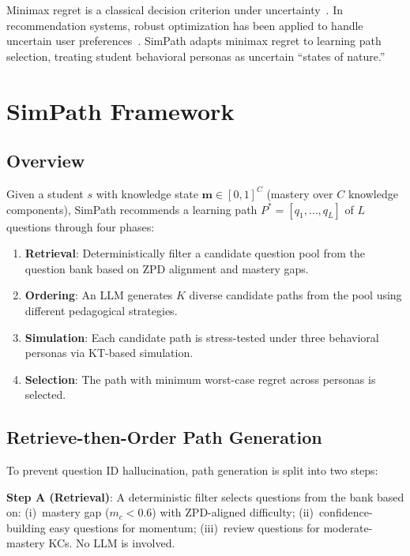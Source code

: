 \documentclass[runningheads]{llncs}
\begin{document}
Minimax regret is a classical decision criterion under uncertainty~\cite{savage1951}.
In recommendation systems, robust optimization has been applied to handle uncertain user preferences~\cite{robust_rec2020}.
SimPath adapts minimax regret to learning path selection, treating student behavioral personas as uncertain ``states of nature.''

\section{SimPath Framework}

\subsection{Overview}

Given a student $s$ with knowledge state $\mathbf{m} \in [0,1]^C$ (mastery over $C$ knowledge components), SimPath recommends a learning path $P^* = [q_1, \dots, q_L]$ of $L$ questions through four phases:

\begin{enumerate}
\item \textbf{Retrieval}: Deterministically filter a candidate question pool from the question bank based on ZPD alignment and mastery gaps.
\item \textbf{Ordering}: An LLM generates $K$ diverse candidate paths from the pool using different pedagogical strategies.
\item \textbf{Simulation}: Each candidate path is stress-tested under three behavioral personas via KT-based simulation.
\item \textbf{Selection}: The path with minimum worst-case regret across personas is selected.
\end{enumerate}

\subsection{Retrieve-then-Order Path Generation}

To prevent question ID hallucination, path generation is split into two steps:

\textbf{Step A (Retrieval)}: A deterministic filter selects questions from the bank based on: (i)~mastery gap ($m_c < 0.6$) with ZPD-aligned difficulty; (ii)~confidence-building easy questions for momentum; (iii)~review questions for moderate-mastery KCs. No LLM is involved.
\end{document}

